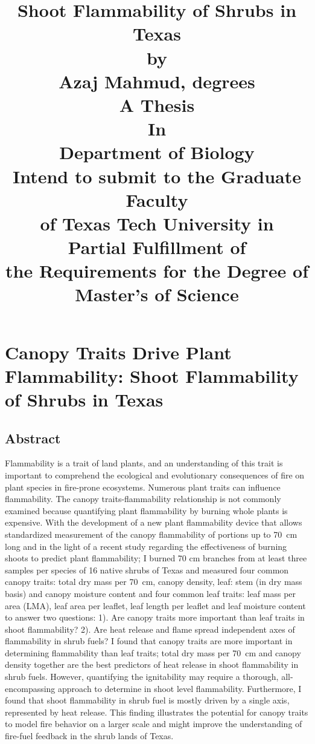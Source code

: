 \documentclass[12pt]{report}
\title{
Shoot Flammability of Shrubs in Texas\\[15pt]
by\\
Azaj Mahmud, degrees\\
A Thesis\\
In\\
Department of Biology\\
Intend to submit to the Graduate Faculty\\
of Texas Tech University in\\
Partial Fulfillment of\\
the Requirements for the Degree of\\
Master's of Science\\}
\begin{document}
\maketitle







\tableofcontents




\listoftables

\listoffigures




\doublespacing

\chapter{Canopy Traits Drive Plant Flammability: Shoot Flammability of Shrubs in Texas}

\section{Abstract}
    
Flammability is a trait of land plants, and an understanding of this trait is important to comprehend the ecological and evolutionary consequences of fire on plant species in fire-prone ecosystems. Numerous plant traits can influence flammability. The canopy traits-flammability relationship is not commonly examined because quantifying plant flammability by burning whole plants is expensive. With the development of a new plant flammability device that allows standardized measurement of the canopy
flammability of portions up to 70 \,cm long and in the light of a recent study regarding the effectiveness of burning shoots to predict plant flammability; I burned 70 cm branches from at least three samples per species of 16 native shrubs of Texas and measured four common canopy traits: total dry mass per 70 \,cm, canopy density, leaf: stem (in dry mass basis) and canopy moisture content and four common leaf traits: leaf mass per area (LMA), leaf area per leaflet, leaf length per leaflet and leaf moisture content to answer two questions: 1).  Are canopy traits more important than leaf traits in shoot flammability? 2). Are heat release and flame spread independent axes of flammability in shrub fuels?  I found that canopy traits are more important in determining flammability than leaf traits; total dry mass per 70 \,cm and canopy density together are the best predictors of heat release in shoot flammability in shrub fuels. However, quantifying the ignitability may require a thorough, all-encompassing approach to determine in shoot level flammability. Furthermore, I found that shoot flammability in shrub fuel is mostly driven by a single axis, represented by heat release. This finding illustrates the potential for canopy traits to model fire behavior on a larger scale and might improve the understanding of fire-fuel feedback in the shrub lands of Texas.
\end{document}
